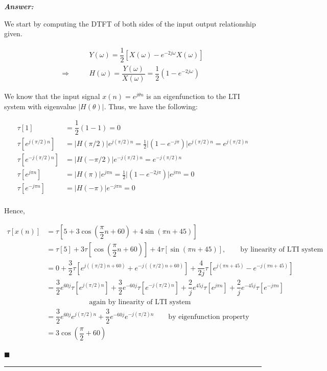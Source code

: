 \documentclass[12pt]{article}
\theoremstyle{definition}
\newenvironment{answer}{
    \textbf{\textit{Answer:}} \qquad
}{\hfill $\blacksquare$ \\ \begin{center}
    \rule{0.6\linewidth}{0.5px}    
\end{center}
}
\begin{document}
\begin{answer}
    We start by computing the DTFT of both sides of the input output relationship given.

    \begin{align*}
        & Y(\omega) = \dfrac{1}{2} \left[ X(\omega) - e^{-2j\omega} X(\omega) \right]\\
        \Rightarrow \qquad & H(\omega) = \dfrac{Y(\omega)}{X(\omega)} = \dfrac{1}{2} (1 - e^{-2j\omega})
    \end{align*}

    We know that the input signal $x(n) = e^{j\theta n}$ is an eigenfunction to the LTI system with eigenvalue $\vert H(\theta) \vert$. Thus, we have the following:
    
    \begin{align*}
        \tau\left[1 \right] & = \dfrac{1}{2}(1 - 1) = 0\\
        \tau\left[e^{j(\pi/2)n} \right] & = \vert H(\pi/2) \vert e^{j(\pi/2)n} = \frac{1}{2}\vert (1 - e^{-j\pi}) \vert e^{j(\pi/2)n} = e^{j(\pi/2)n}\\
        \tau\left[e^{-j(\pi/2)n} \right] & = \vert H(-\pi/2) \vert e^{-j(\pi/2)n} = e^{-j(\pi/2)n}\\
        \tau\left[e^{j\pi n} \right] & = \vert H(\pi) \vert e^{j\pi n} = \frac{1}{2} \vert (1 - e^{-2j\pi}) \vert e^{j \pi n} = 0 \\
        \tau\left[e^{-j \pi n} \right] & = \vert H(-\pi) \vert e^{-j\pi n} = 0\\
    \end{align*}

    Hence,

    \begin{align*}
        \tau[x(n)]
        & = \tau\left[ 5 + 3 \cos\left( \dfrac{\pi}{2}n + 60 \right) + 4 \sin\left( \pi n + 45 \right)\right]\\
        & = \tau\left[ 5 \right] + 3 \tau\left[ \cos\left( \dfrac{\pi}{2}n + 60 \right) \right] + 4 \tau\left[ \sin\left( \pi n + 45 \right) \right], \qquad \text{by linearity of LTI system}\\
        & = 0 + \dfrac{3}{2} \tau\left[ e^{j((\pi/2)n + 60)} + e^{-j((\pi/2)n + 60)} \right] + \dfrac{4}{2j} \tau\left[ e^{j(\pi n + 45)} - e^{-j(\pi n + 45)} \right]\\
        & = \dfrac{3}{2} e^{60j} \tau[e^{j(\pi/2)n}] + \dfrac{3}{2} e^{-60j} \tau[e^{-j(\pi/2)n}] + \dfrac{2}{j}e^{45j} \tau[e^{j\pi n}] + \dfrac{2}{j}e^{-45j} \tau[e^{-j\pi n}]\\
        & \qquad \qquad \qquad \text{again by linearity of LTI system}\\
        & = \dfrac{3}{2} e^{60j}e^{j(\pi/2)n} + \dfrac{3}{2} e^{-60j}e^{-j(\pi/2)n} \qquad \text{by eigenfunction property}\\
        & = 3 \cos\left( \dfrac{\pi}{2} + 60 \right)
    \end{align*}

\end{answer}
\end{document}
